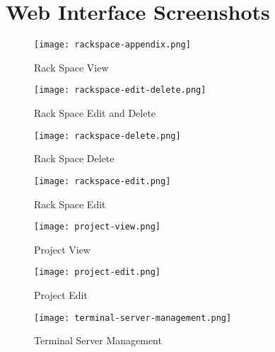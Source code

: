 \chapter{Web Interface Screenshots}
\label{chap:appendix-c}
\begin{figure}[H]
    \centering
    \texttt{[image: rackspace-appendix.png]}
    \caption{Rack Space View}
    \label{fig:rackspace-view}
\end{figure}

\begin{figure}[H]
    \centering
    \texttt{[image: rackspace-edit-delete.png]}
    \caption{Rack Space Edit and Delete}
    \label{fig:rackspace-edit-delete}
\end{figure}

\begin{figure}[H]
    \centering
    \texttt{[image: rackspace-delete.png]}
    \caption{Rack Space Delete}
    \label{fig:rackspace-delete}
\end{figure}

\begin{figure}[H]
    \centering
    \texttt{[image: rackspace-edit.png]}
    \caption{Rack Space Edit}
    \label{fig:rackspace-edit}
\end{figure}

\begin{figure}[H]
    \centering
    \texttt{[image: project-view.png]}
    \caption{Project View}
    \label{fig:project-view}
\end{figure}

\begin{figure}[H]
    \centering
    \texttt{[image: project-edit.png]}
    \caption{Project Edit}
    \label{fig:project-edit}
\end{figure}

\begin{figure}[H]
    \centering
    \texttt{[image: terminal-server-management.png]}
    \caption{Terminal Server Management}
    \label{fig:terminal-server-management}
\end{figure}
